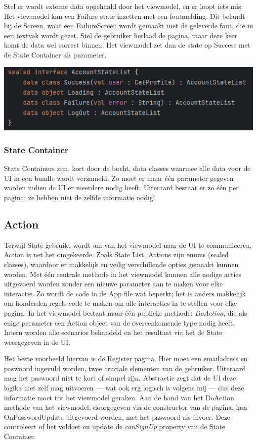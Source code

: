 \documentclass{report}
\begin{document}
Stel er wordt externe data opgehaald door het viewmodel, en er loopt iets mis. Het viewmodel kan een Failure state inzetten met een foutmelding.
Dit belandt bij de Screen, waar een FailureScreen wordt gemaakt met de geleverde fout, die in een textvak wordt gezet.
Stel de gebruiker herlaad de pagina, maar deze keer komt de data wel correct binnen. Het viewmodel zet dan de state op Success met de State Container als parameter.

\begin{center}
    \includegraphics{VM_State}
\end{center}

\subsubsection{State Container}
State Containers zijn, kort door de bocht, data classes waarmee alle data voor de UI in een bundle wordt verzameld.
Zo moet er maar één parameter gegeven worden indien de UI er meerdere nodig heeft.
Uiteraard bestaat er zo één per pagina; ze hebben niet de zelfde informatie nodig!



\subsection{Action}
Terwijl State gebruikt wordt om van het viewmodel naar de UI te communiceren, Action is net het omgekeerde.
Zoals State List, Actions zijn enums (sealed classes), waardoor er makkelijk en veilig verschillende opties gemaakt kunnen worden.
Met één centrale methode in het viewmodel kunnen alle nodige acties uitgevoerd worden zonder een nieuwe parameter aan te maken voor elke interactie.
Zo wordt de code in de App file wat beperkt; het is anders makkelijk om honderden regels code te maken om alle interacties in te stellen voor elke pagina.
In het viewmodel bestaat maar één publieke methode: \textit{DoAction}, die als enige parameter een Action object van de overeenkomende type nodig heeft.
Intern worden alle scenarios behandeld en het resultaat via het de State weergegeven in de UI. 

Het beste voorbeeld hiervan is de Register pagina. Hier moet een emailadress en paswoord ingevuld worden, twee cruciale elementen van de gebruiker.
Uiteraard mag het paswoord niet te kort of simpel zijn.
Abstractie zegt dat de UI deze logika niet zelf mag uitvoeren --- wat ook erg logisch is volgens mij --- dus deze informatie moet tot het viewmodel geraken.
Aan de hand van het DoAction methode van het viewmodel, doorgegeven via de constructor van de pagina, kan OnPasswordUpdate uitgevoerd worden, met het paswoord als invoer.
Deze controleert of het voldoet en update de \textit{canSignUp} property van de State Container.
\end{document}
